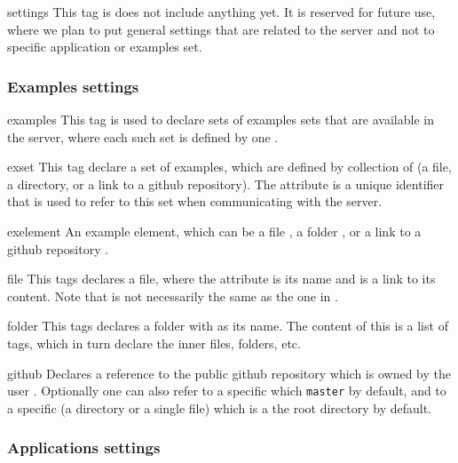 \bigskip
\xmlstruct
{settings}
{%
%
  This tag is does not include anything yet. It is reserved for future
  use, where we plan to put general settings that are related to the
  server and not to specific application or examples set.
%
}
{}%

\subsubsection*{Examples settings}

\bigskip
\xmlstruct
{examples}
{%
%
  This tag is used to declare sets of examples sets that are available
  in the server, where each such set is defined by one
  .
%
}
{}%

\bigskip
\xmlstruct
{exset}
{%
%
  This tag declare a set of examples, which are defined by collection
  of  (a file, a directory, or a link to a
  github repository).
%
  The attribute  is a unique identifier that is used
  to refer to this set when communicating with the server.
%
}
{}%

\bigskip
\xmlstruct
{exelement}
{%
%
  An example element, which can be a file , a
  folder , or a link to a github repository
  .
%
}
{}%


\bigskip
\xmlstruct
{file}
{%
%
  This tags declares a file, where the  attribute
  is its name and  is a link to its content. Note
  that  is not necessarily the same as the one in
  .
%
}
{}%

\bigskip
\xmlstruct
{folder}
{%
%
  This tags declares a folder with  as its
  name. The content of this is a list of 
  tags, which in turn declare the inner files, folders, etc.
%
}
{}%


\bigskip
\xmlstruct
{github}
{%
%
  Declares a reference to the public github repository
   which is owned by the user
  . Optionally one can also refer to a specific
   which \texttt{master} by default, and to a
  specific  (a directory or a single file) which
  is a the root directory by default.
%
}
{}%

\subsubsection*{Applications settings}

